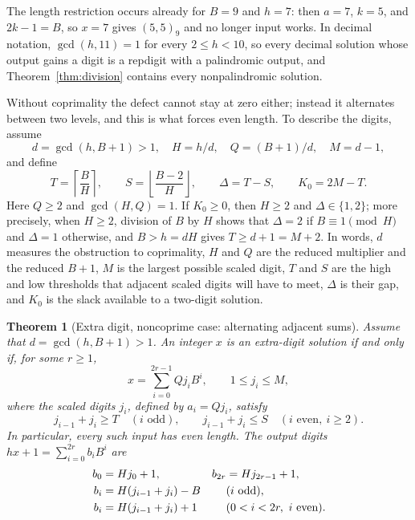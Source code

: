 \documentclass[11pt]{amsart}
\newtheorem{theorem}{Theorem}[section]
\theoremstyle{remark}\newtheorem{remark}[theorem]{Remark}
\begin{document}
The length restriction occurs already for $B=9$ and $h=7$: then $a=7$, $k=5$, and $2k-1=B$, so $x=7$ gives $(5,5)_9$ and no longer input works. In decimal notation, $\gcd(h,11)=1$ for every $2\le h<10$, so every decimal solution whose output gains a digit is a repdigit with a palindromic output, and Theorem~\ref{thm:division} contains every nonpalindromic solution.

Without coprimality the defect cannot stay at zero either; instead it alternates between two levels, and this is what forces even length. To describe the digits, assume
\begin{equation}\label{nc:eq:parameters}
 d=\gcd(h,B+1)>1,\quad H=h/d,\quad Q=(B+1)/d,\quad M=d-1,
\end{equation}
and define
\begin{equation}\label{nc:eq:thresholds}
 T=\left\lceil\frac BH\right\rceil,\qquad
 S=\left\lfloor\frac{B-2}{H}\right\rfloor,\qquad
 \Delta=T-S,\qquad K_0=2M-T.
\end{equation}
Here $Q\ge2$ and $\gcd(H,Q)=1$. If $K_0\ge0$, then $H\ge2$ and $\Delta\in\{1,2\}$; more precisely, when $H\ge2$, division of $B$ by $H$ shows that $\Delta=2$ if $B\equiv1\pmod H$ and $\Delta=1$ otherwise, and $B>h=dH$ gives $T\ge d+1=M+2$. In words, $d$ measures the obstruction to coprimality, $H$ and $Q$ are the reduced multiplier and the reduced $B+1$, $M$ is the largest possible scaled digit, $T$ and $S$ are the high and low thresholds that adjacent scaled digits will have to meet, $\Delta$ is their gap, and $K_0$ is the slack available to a two-digit solution.

\begin{theorem}[Extra digit, noncoprime case: alternating adjacent sums]\label{nc:thm:classification}
Assume that $d=\gcd(h,B+1)>1$. An integer $x$ is an extra-digit solution if and only if, for some $r\ge1$,
\[
 x=\sum_{i=0}^{2r-1}Qj_iB^i,\qquad 1\le j_i\le M,
\]
where the \emph{scaled digits} $j_i$, defined by $a_i=Qj_i$, satisfy
\begin{equation}\label{nc:eq:alternating}
 j_{i-1}+j_i\ge T\quad(i\text{ odd}),\qquad
 j_{i-1}+j_i\le S\quad(i\text{ even},\ i\ge2).
\end{equation}
In particular, every such input has even length. The output digits $hx+1=\sum_{i=0}^{2r}b_iB^i$ are
\begin{align}\label{nc:eq:output}
 b_0&=Hj_0+1,& b_{2r}&=Hj_{2r-1}+1,\notag\\
 b_i&=H(j_{i-1}+j_i)-B&& (i\text{ odd}),\notag\\
 b_i&=H(j_{i-1}+j_i)+1&& (0<i<2r,\ i\text{ even}).
\end{align}
\end{theorem}
\end{document}

